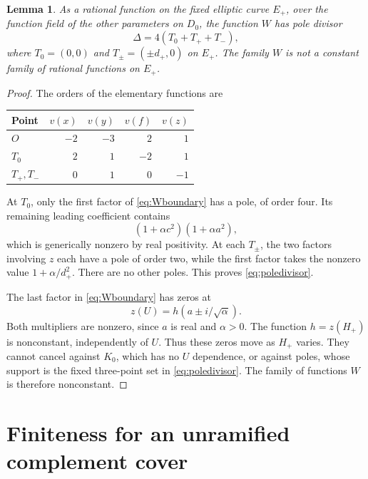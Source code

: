 \documentclass[11pt,a4paper]{article}
\newtheorem{lemma}[theorem]{Lemma}
\theoremstyle{remark}\newtheorem{remark}[theorem]{Remark}
\begin{document}
\begin{lemma}\label{lem:divisor}
As a rational function on the fixed elliptic curve $E_+$, over
the function field of the other parameters on $D_0$, the function
$W$ has pole divisor
\begin{equation}\label{eq:poledivisor}
                   \Delta=4(T_0+T_++T_-),
\end{equation}
where $T_0=(0,0)$ and $T_\pm=(\pm d_+,0)$ on $E_+$.
The family $W$ is not a constant family of rational functions on
$E_+$.
\end{lemma}
\begin{proof}
The orders of the elementary functions are
\begin{center}
\begin{tabular}{lrrrr}\toprule
Point & $v(x)$ & $v(y)$ & $v(f)$ & $v(z)$\\\midrule
$O$ & $-2$ & $-3$ & $2$ & $1$\\
$T_0$ & $2$ & $1$ & $-2$ & $1$\\
$T_+,T_-$ & $0$ & $1$ & $0$ & $-1$\\\bottomrule
\end{tabular}
\end{center}
At $T_0$, only the first factor of \eqref{eq:Wboundary} has a
pole, of order four. Its remaining leading coefficient contains
\[
                  (1+\alpha c^2)(1+\alpha a^2),
\]
which is generically nonzero by real positivity. At each $T_\pm$,
the two factors involving $z$ each have a pole of order two,
while the first factor takes the nonzero value
$1+\alpha/d_+^2$. There are no other poles. This proves
\eqref{eq:poledivisor}.

The last factor in \eqref{eq:Wboundary} has zeros at
\begin{equation}\label{eq:moving}
                    z(U)=h(a\pm i/\sqrt\alpha).
\end{equation}
Both multipliers are nonzero, since $a$ is real and $\alpha>0$.
The function $h=z(H_+)$ is nonconstant, independently of $U$.
Thus these zeros move as $H_+$ varies. They cannot cancel against
$K_0$, which has no $U$ dependence, or against poles, whose
support is the fixed three-point set in \eqref{eq:poledivisor}.
The family of functions $W$ is therefore nonconstant.
\end{proof}

\section{Finiteness for an unramified complement cover}
\end{document}
